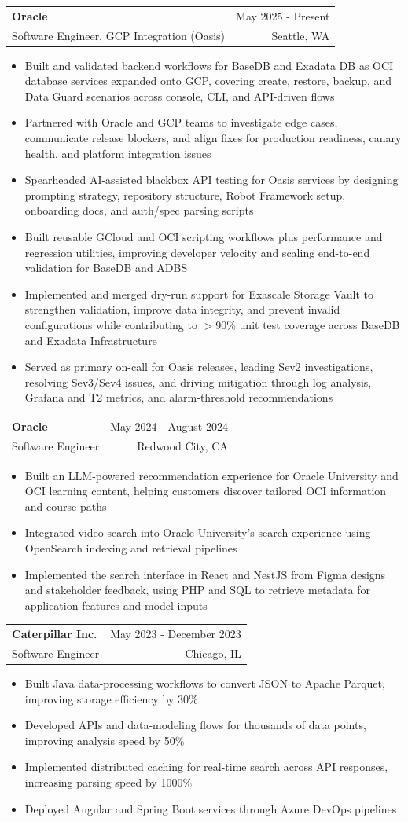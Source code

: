 \documentclass[letterpaper,11pt]{article}
\makeatletter
\newcommand{\resumeItem}[1]{
  \item\small{
    {#1 \vspace{-2pt}}
  }
}
\newcommand{\resumeSubheading}[4]{
  \vspace{-2pt}\item
    \begin{tabular*}{0.97\textwidth}[t]{l@{\extracolsep{\fill}}r}
      \textbf{#1} & #2 \\
      {\small#3} & {\small #4} \\
    \end{tabular*}\vspace{-7pt}
}
\newcommand{\resumeItemListStart}{\begin{itemize}}
\newcommand{\resumeItemListEnd}{\end{itemize}\vspace{-5pt}}
\makeatother
\begin{document}
    \resumeSubheading
  {Oracle}{May 2025 - Present}
  {Software Engineer, GCP Integration (Oasis)}{Seattle, WA}
  \resumeItemListStart
    \resumeItem{Built and validated backend workflows for BaseDB and Exadata DB as OCI database services expanded onto GCP, covering create, restore, backup, and Data Guard scenarios across console, CLI, and API-driven flows}
    \resumeItem{Partnered with Oracle and GCP teams to investigate edge cases, communicate release blockers, and align fixes for production readiness, canary health, and platform integration issues}
    \resumeItem{Spearheaded AI-assisted blackbox API testing for Oasis services by designing prompting strategy, repository structure, Robot Framework setup, onboarding docs, and auth/spec parsing scripts}
    \resumeItem{Built reusable GCloud and OCI scripting workflows plus performance and regression utilities, improving developer velocity and scaling end-to-end validation for BaseDB and ADBS}
    \resumeItem{Implemented and merged dry-run support for Exascale Storage Vault to strengthen validation, improve data integrity, and prevent invalid configurations while contributing to $>$90\% unit test coverage across BaseDB and Exadata Infrastructure}
    \resumeItem{Served as primary on-call for Oasis releases, leading Sev2 investigations, resolving Sev3/Sev4 issues, and driving mitigation through log analysis, Grafana and T2 metrics, and alarm-threshold recommendations}
  \resumeItemListEnd

    \resumeSubheading
      {Oracle}{May 2024 - August 2024}
      {Software Engineer}{Redwood City, CA}
      \resumeItemListStart
        \resumeItem{Built an LLM-powered recommendation experience for Oracle University and OCI learning content, helping customers discover tailored OCI information and course paths}
        \resumeItem{Integrated video search into Oracle University's search experience using OpenSearch indexing and retrieval pipelines}
        \resumeItem{Implemented the search interface in React and NestJS from Figma designs and stakeholder feedback, using PHP and SQL to retrieve metadata for application features and model inputs}
      \resumeItemListEnd

    \resumeSubheading
      {Caterpillar Inc.}{May 2023 - December 2023}
      {Software Engineer}{Chicago, IL}
      \resumeItemListStart
        \resumeItem{Built Java data-processing workflows to convert JSON to Apache Parquet, improving storage efficiency by 30\%}
        \resumeItem{Developed APIs and data-modeling flows for thousands of data points, improving analysis speed by 50\%}
        \resumeItem{Implemented distributed caching for real-time search across API responses, increasing parsing speed by 1000\%}
        \resumeItem{Deployed Angular and Spring Boot services through Azure DevOps pipelines}
      \resumeItemListEnd
\end{document}
